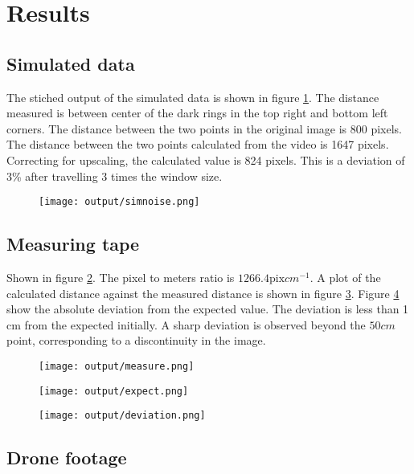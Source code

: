 \section{Results}
\subsection{Simulated data}

The stiched output of the simulated data is shown in figure \ref{fig:simnoise}.
The distance measured is between center of the dark rings in the top right and bottom left corners.
The distance between the two points in the original image is 800 pixels.
The distance between the two points calculated from the video is 1647 pixels.
Correcting for upscaling, the calculated value is 824 pixels.
This is a deviation of 3\% after travelling 3 times the window size.

\begin{figure}
  \centering
  \texttt{[image: output/simnoise.png]}
  \caption{  }
  \label{fig:simnoise}
\end{figure}

\subsection{Measuring tape}

Shown in figure \ref{fig:measure}.
The pixel to meters ratio is $1266.4 \text{pix} cm^{-1}$.
A plot of the calculated distance against the measured distance is shown in figure \ref{fig:expect}.
Figure \ref{fig:deviation} show the absolute deviation from the expected value.
The deviation is less than 1 cm from the expected initially.
A sharp deviation is observed beyond the $50 cm$ point,
corresponding to a discontinuity in the image.

\begin{figure}
  \centering
  \texttt{[image: output/measure.png]}
  \caption{}
  \label{fig:measure}
\end{figure}

\begin{figure}
  \centering
  \texttt{[image: output/expect.png]}
  \caption{}
  \label{fig:expect}
\end{figure}

\begin{figure}
  \centering
  \texttt{[image: output/deviation.png]}
  \caption{}
  \label{fig:deviation}
\end{figure}

\subsection{Drone footage}

